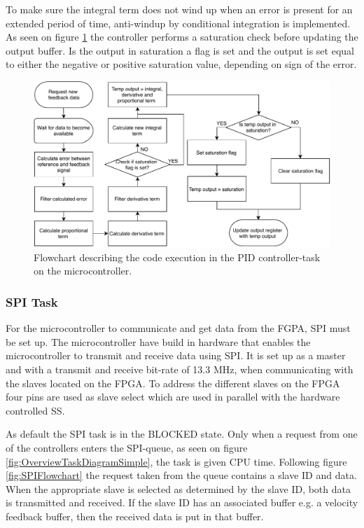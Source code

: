 \documentclass[../../main.tex]{subfiles}
\begin{document}
To make sure the integral term does not wind up when an error is present for an extended period of time, anti-windup by conditional integration is implemented. As seen on figure \ref{fig:PIDControllerFlowchart} the controller performs a saturation check before updating the output buffer. Is the output in saturation a flag is set and the output is set equal to either the negative or positive saturation value, depending on sign of the error. 


\begin{figure}[H]
    \centering
    \includegraphics[width=\textwidth]{Sections/System_Implementation/Images/PIDControllerFlowchart.pdf}
    \caption{Flowchart describing the code execution in the PID controller-task on the microcontroller.}
    \label{fig:PIDControllerFlowchart}
\end{figure}





\subsubsection*{SPI Task}
For the microcontroller to communicate and get data from the FGPA, SPI must be set up.
The microcontroller have build in hardware that enables the microcontroller to transmit and receive data using SPI. It is set up as a master and with a transmit and receive bit-rate of 13.3 MHz, when communicating with the slaves located on the FPGA. 
To address the different slaves on the FPGA four pins are used as slave select which are used in parallel with the hardware controlled SS.

As default the SPI task is in the BLOCKED state. Only when a request from one of the controllers enters the SPI-queue, as seen on figure \ref{fig:OverviewTaskDiagramSimple}, the task is given CPU time. Following figure \ref{fig:SPIFlowchart} the request taken from the queue contains a slave ID and data. When the appropriate slave is selected as determined by the slave ID, both data is transmitted and received. If the slave ID has an associated buffer e.g. a velocity feedback buffer, then the received data is put in that buffer.  
\end{document}
